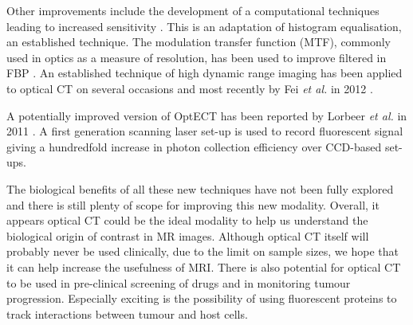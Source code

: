 	Other improvements include the development of a computational techniques leading to increased sensitivity \cite{Hornblad:2011fh}. This is an adaptation of histogram equalisation, an established technique.
	The modulation transfer function (MTF), commonly used in optics as a measure of resolution, has been used to improve filtered in FBP \cite{Chen:2012}.
	An established technique of high dynamic range imaging has been applied to optical CT on several occasions and most recently by Fei \textit{et al.} in 2012 \cite{Peng:2012wi}.
	
	A potentially improved version of OptECT has been reported by Lorbeer \textit{et al.} in 2011  \cite{Lorbeer:2011}. A first generation scanning laser set-up is used to record fluorescent signal giving a hundredfold increase in photon collection efficiency over CCD-based set-ups. 
	
	The  biological benefits of all these new techniques have not been fully explored and there is still plenty of scope for improving this new modality.  Overall, it appears optical CT could be the ideal modality to help us understand the biological origin of contrast in MR images. Although optical CT itself will probably never be used clinically, due to the limit on sample sizes, we hope that it can help increase the usefulness of MRI. There is also potential for optical CT to be used in pre-clinical screening of drugs and in monitoring tumour progression. Especially exciting is the possibility of using fluorescent proteins to track interactions between tumour and host cells. 
	
	


